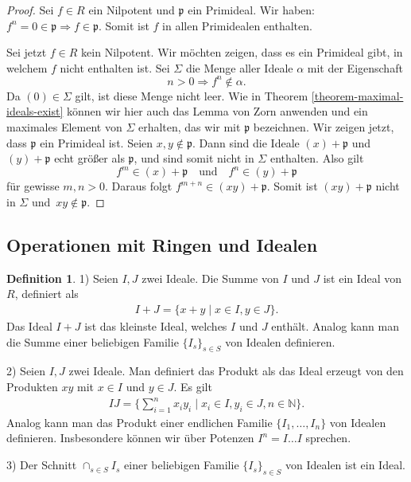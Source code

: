\documentclass[reqno,12pt]{article}
\numberwithin{equation}{section}
\theoremstyle{plain}
\theoremstyle{definition}
\newtheorem{definition}[thm]{Definition}
\begin{document}
\begin{proof}
Sei $f \in R$ ein Nilpotent und $\mathfrak{p}$ ein Primideal. Wir haben: $f^n = 0\in \mathfrak{p} \Rightarrow f \in \mathfrak{p}$. Somit ist $f$ in allen Primidealen enthalten.

Sei jetzt $f \in R$ kein Nilpotent. Wir möchten zeigen, dass es ein Primideal gibt, in welchem $f$ nicht enthalten ist. Sei $\Sigma$ die Menge aller Ideale $\alpha$ mit der Eigenschaft
$$
n > 0 \Rightarrow f^n \notin \alpha.
$$
Da $(0) \in \Sigma$ gilt, ist diese Menge nicht leer. Wie in Theorem \ref{theorem-maximal-ideals-exist} können wir hier auch das Lemma von Zorn anwenden und ein maximales Element von $\Sigma$ erhalten, das wir mit $\mathfrak{p}$ bezeichnen. Wir zeigen jetzt, dass $\mathfrak{p}$ ein Primideal ist. Seien $x,y \notin \mathfrak{p}$. Dann sind die Ideale $(x) + \mathfrak{p}$ und $(y) + \mathfrak{p}$ echt größer als $\mathfrak{p}$, und sind somit nicht in $\Sigma$ enthalten. Also gilt
$$
f^m \in (x) + \mathfrak{p} \quad \text{und} \quad f^n \in (y) + \mathfrak{p}
$$
für gewisse $m,n > 0$. Daraus folgt $f^{m+n} \in (xy) + \mathfrak{p}$. Somit ist $(xy) + \mathfrak{p}$ nicht in $\Sigma$ und~$xy \notin \mathfrak{p}$.
\end{proof}



\subsection{Operationen mit Ringen und Idealen}

\begin{definition}
1) Seien $I,J$ zwei Ideale. Die {\sf Summe} von $I$ und $J$ ist ein Ideal von $R$, definiert als
\begin{align*}
  I+J = \{ x+y \mid x \in I, y \in J \}.
\end{align*}
Das Ideal $I+J$ ist das kleinste Ideal, welches $I$ und $J$ enthält. Analog kann man die Summe einer beliebigen Familie $\{I_s\}_{s \in S}$ von Idealen definieren.

\smallskip

2) Seien $I,J$ zwei Ideale. Man definiert das {\sf Produkt} als das Ideal erzeugt von den Produkten $xy$ mit $x \in I$ und $y \in J$. Es gilt
\begin{align*}
  IJ = \big \{ \sum_{i=1}^n x_iy_i \mid x_i \in I, y_i \in J, n\in \mathbb{N} \big \}.
\end{align*}
Analog kann man das Produkt einer endlichen Familie $\{I_1, \dots, I_n\}$ von Idealen definieren. Insbesondere können wir über Potenzen $I^n = I \dots I$ sprechen.

\smallskip

3) Der {\sf Schnitt} $\cap_{s \in S} I_s$ einer beliebigen Familie $\{I_s\}_{s \in S}$ von Idealen ist ein Ideal.
\end{definition}
\end{document}
